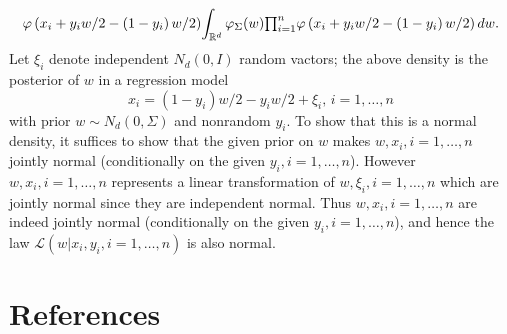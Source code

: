 \documentclass[11pt,twoside]{article}%
\theoremstyle{change}
\newenvironment{quote-env}{\begin{quote}\sffamily }{\end{quote}}
\newenvironment{mycomments-env}[1][Mycomments]{\textbf{#1.} \begin{quote-env} }{ \end{quote-env}  \ \rule{0.5em}{0.5em}}
\begin{document}
\begin{mycomments}
\begin{mycomments-env}
\[{%
\varphi\left(  x_{i}+y_{i}w/2-\left(  1-y_{i}\right)  w/2\right)  }%
{\int_{\mathbb{R}^{d}}\varphi_{\Sigma}(w)%
{\textstyle\prod\nolimits_{i=1}^{n}}
\varphi\left(  x_{i}+y_{i}w/2-\left(  1-y_{i}\right)  w/2\right)  dw}.
\]
Let $\xi_{i}$ denote independent $N_{d}\left(  0,I\right)  $ random vactors;
the above density is the posterior of $w$ in a regression model
\[
x_{i}=\left(  1-y_{i}\right)  w/2-y_{i}w/2+\xi_{i}\text{, }i=1,\ldots,n
\]
with prior $w\sim N_{d}\left(  0,\Sigma\right)  $ and nonrandom $y_{i}$. To
show that this is a normal density, it suffices to show that the given prior
on $w$ makes $w,x_{i},i=1,\ldots,n$ jointly normal (conditionally on the given
$y_{i},i=1,\ldots,n$). However $w,x_{i},i=1,\ldots,n$ represents a linear
transformation of $w,\xi_{i},i=1,\ldots,n$ which are jointly normal since they
are independent normal. Thus $w,x_{i},i=1,\ldots,n$ are indeed jointly normal
(conditionally on the given $y_{i},i=1,\ldots,n$), and hence the law
$\mathcal{L}(w|x_{i},y_{i},i=1,\ldots,n)$ is also normal.
\end{mycomments-env}%

\end{mycomments}%


\section{References}
\end{document}
